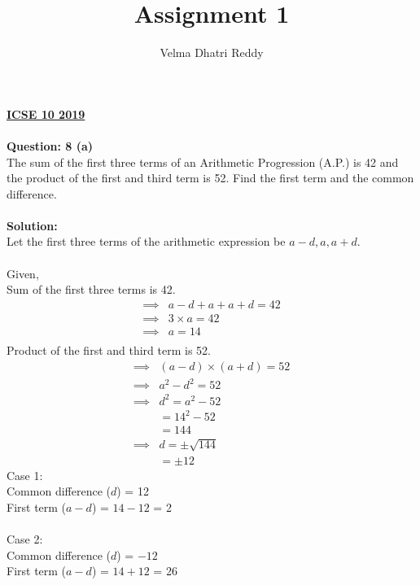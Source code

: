 \documentclass[12pt, a4paper] {article}
\title{Assignment 1}
\author{Velma Dhatri Reddy }
\begin{document}
\maketitle
\begin{multicols}{2}
\textbf{\underline{ICSE 10 2019}}\\\\
\textbf{Question: 8 (a)}\\
The sum of the first three terms of an Arithmetic Progression (A.P.) is 42 and the product of the first and third term is 52. Find the first term and the common difference.\\\\
\textbf{Solution: }\\
Let the first three terms of the arithmetic expression be $a-d, a, a+d$.\\\\
Given,\\
Sum of the first three terms is 42.
\begin{align*}
    \implies
    &a - d + a + a + d = 42\\
    \implies
    &3 \times a = 42\\
    \implies
    &a = 14\\
\end{align*}
Product of the first and third term is 52.
\begin{align*}
    \implies 
    &(a - d) \times (a + d) = 52\\
    \implies
    &a^2 - d^2 = 52\\
    \implies
    &d^2 = a^2 - 52\\
    &= 14^2 - 52\\
    &= 144\\
    \implies
    &d = \pm \sqrt{144}\\
    &= \pm 12
\end{align*}
Case 1:\\
Common difference ($d$) = 12\\
First term ($a - d$) = $14 - 12$ = 2\\\\
Case 2:\\
Common difference ($d$) = $-12$\\
First term ($a - d$) = $14 + 12$ = 26\\
\end{multicols}
\end{document}
